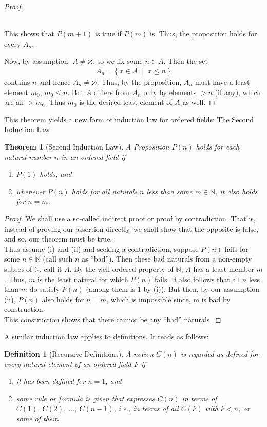 \documentclass[12pt]{book}
\newcommand{\N}{\mathbb{N}}
\newtheorem{theorem}{Theorem}
\theoremstyle{definition}
\newtheorem{definition}{Definition}[section]
\begin{document}
\begin{proof}
\begin{enumerate}[label=(\roman*)]
		\\
		This shows that $P(m+1)$ is true if $P(m)$ is. Thus, the proposition holds for every $A_n$.  
\end{enumerate}
Now, by assumption, $A \neq \varnothing$; so we fix some $n \in A$. Then the set
\begin{align*}
	A_n = \{ \ x \in A\;\; |\;\; x \leq n\ \}	
\end{align*}
contains $n$ and hence $A_n \neq \varnothing$. Thus, by the proposition, $A_n$ must have a least element $m_0$, $m_0 \leq n$. But $A$ differs from $A_n$ only by elements $> n$ (if any), which are all $> m_0$. Thus $m_0$ is the desired least element of $A$ as well.
\end{proof} 
This theorem yields a new form of induction law for ordered fields: The Second Induction Law
\begin{theorem}[Second Induction Law]
A Proposition $P(n)$ holds for each natural number $n$ in an ordered field if
\begin{enumerate} [label = (\roman*)]
	\item $P(1)$ holds, and 
	\item whenever $P(n)$ holds for all naturals $n$ less than some $m \in \N$, it also holds for $n=m$.  
\end{enumerate} 
\end{theorem}
\begin{proof}
We shall use a so-called indirect proof or proof by contradiction. That is, instead of proving our assertion directly, we shall show that the opposite is false, and so, our theorem must be true. 
\\
\indent Thus assume (i) and (ii) and seeking a contradiction, suppose $P(n)$ fails for some $n \in \N$ (call such $n$ as ``bad''). Then these bad naturals from a non-empty subset of $\N$, call it $A$. By the well ordered property of $\N$, $A$ has a least member $m$. Thus, $m$ is the least natural for which $P(n)$  fails. If also follows that all $n$ less than $m$ do satisfy $P(n)$ (among them is 1 by (i)). But then, by our assumption (ii), $P(n)$ also holds for $n=m$, which is impossible since, m is bad by construction.\\
\indent This construction shows that there cannot be any ``bad'' naturals.    
\end{proof} 
\noindent  A similar induction law applies to definitions. It reads as follows:
\begin{definition}[Recursive Definitions]
\textit{A notion $C(n)$ is regarded as defined for every natural element of an ordered field $F$ if }
\begin{enumerate}[label =(\roman*)]
	\item \textit{it has been defined for $n=1$, and}
	\item \textit{some rule or formula is given that expresses $C(n)$ in terms of $C(1),\ C(2),\ ...,\ C(n-1)$, i.e., in terms of all $C(k)$ with $k<n$, or some of them.}
\end{enumerate}
\end{definition}
\end{document}
